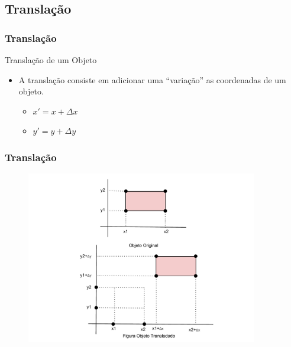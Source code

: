 \documentclass{beamer}
\begin{document}

\subsection{Translação}
\begin{frame}
\frametitle{Translação}


	\begin{block}{Translação de um Objeto}
		\begin{itemize}
			\item A translação consiste em adicionar uma ``variação'' as coordenadas de um objeto.
			\begin{itemize}
				\item $x' = x + \Delta x$
				\item $y' = y + \Delta y$
			\end{itemize}
		\end{itemize}
		
	\end{block}
	
\end{frame}


\begin{frame}
\frametitle{Translação}
	\begin{figure}[!h]
			\begin{center}
			\includegraphics[width=0.9\textwidth]{Figures/Translacao}
			\end{center}
	\end{figure}	
	
\end{frame}
\end{document}
